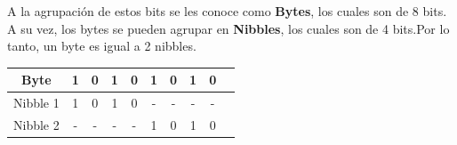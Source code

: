 \documentclass{templateNote}
\begin{document}
\noindent A la agrupación de estos bits se les conoce como \textbf{Bytes}, los cuales son de 8 bits. A su vez, los bytes se pueden agrupar en \textbf{Nibbles}, los cuales son de 4 bits.Por lo tanto, un byte es igual a 2 nibbles.
\begin{center}
    \begin{tabular}{|c|c|c|c|c|c|c|c|c|c|}
    \hline
    Byte & 1 & 0 & 1 & 0 & 1 & 0 & 1 & 0 \\
    \hline
    Nibble 1 & 1 & 0 & 1 & 0 & - & - & - & - \\
    Nibble 2 & - & - & - & - & 1 & 0 & 1 & 0 \\
    \hline
    \end{tabular}
\end{center}
\end{document}
